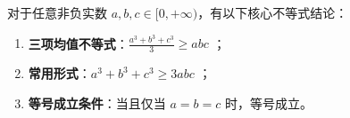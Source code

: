 \begin{statementbox}
对于任意非负实数 $a, b, c \in [0, +\infty)$，有以下核心不等式结论：
\begin{enumerate}
    \item \textbf{三项均值不等式}：$\frac{a^3+b^3+c^3}{3} \geqslant abc$ ；
    \item \textbf{常用形式}：$a^3 + b^3 + c^3 \geqslant 3abc$ ；
    \item \textbf{等号成立条件}：当且仅当 $a = b = c$ 时，等号成立。
\end{enumerate}
\end{statementbox}